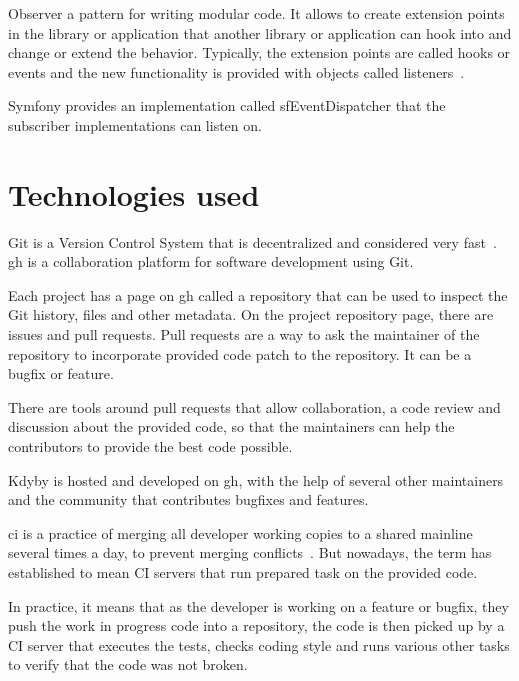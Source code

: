  \label{sec:theory:observer-pattern}

Observer a pattern for writing modular code. It allows to create extension points in the library or application that another library or application can hook into and change or extend the behavior. Typically, the extension points are called hooks or events and the new functionality is provided with objects called listeners~\cite{vlissides1995design}.

Symfony provides an implementation called \gls{sfEventDispatcher} that the subscriber implementations can listen on.

\section{Technologies used}

 \label{sec:theory:git}

Git is a Version Control System that is decentralized and considered very fast~\cite{progit}. \gls{gh} is a collaboration platform for software development using Git.

Each project has a page on \gls{gh} called a repository that can be used to inspect the Git history, files and other metadata. On the project repository page, there are issues and pull requests. Pull requests are a way to ask the maintainer of the repository to incorporate provided code patch to the repository. It can be a bugfix or feature.

There are tools around pull requests that allow collaboration, a code review and discussion about the provided code, so that the maintainers can help the contributors to provide the best code possible.

Kdyby is hosted and developed on \gls{gh}, with the help of several other maintainers and the community that contributes bugfixes and features.

 \label{sec:theory:ci}

\gls{ci} is a practice of merging all developer working copies to a shared mainline several times a day, to prevent merging conflicts~\cite{fowler2006continuous}. But nowadays, the term has established to mean CI servers that run prepared task on the provided code.

In practice, it means that as the developer is working on a feature or bugfix, they push the work in progress code into a repository, the code is then picked up by a CI server that executes the tests, checks coding style and runs various other tasks to verify that the code was not broken.

